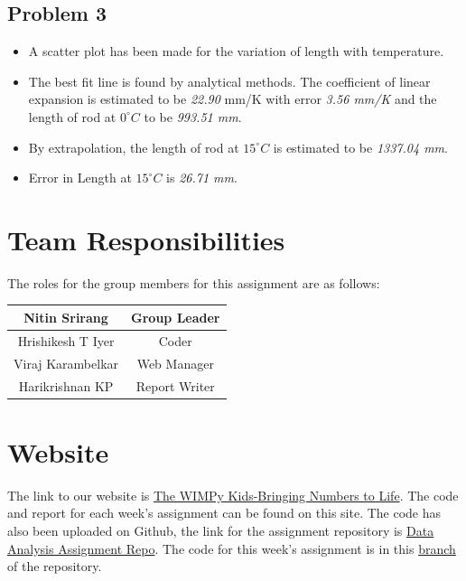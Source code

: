 \documentclass{extarticle}
\begin{document}
		\subsection{\color{MidnightBlue} Problem 3}
		\begin{itemize}
		\item A scatter plot has been made for the variation of length with temperature.
		\item The best fit line is found by analytical methods. The coefficient of linear expansion is estimated to be 
			\emph{22.90} mm/K with error \emph{3.56 mm/K} and the length of rod at $ 0^{\circ}C $ to be \emph{993.51 mm}.
		\item By extrapolation, the length of rod at $ 15^{\circ}C $ is estimated to be \emph{1337.04 mm}.
		\item Error in Length at $ 15^{\circ}C $ is \emph{26.71 mm}.
		\end{itemize}
		
		\newpage
		
	\section{\color{Blue} Team Responsibilities}
		The roles for the group members for this assignment are as follows:
		\begin{center}
		\begin{tabular}{|c|c|}
		\hline
		Nitin Srirang & Group Leader \\
		\hline
		Hrishikesh T Iyer & Coder \\
		\hline
		Viraj Karambelkar & Web Manager \\
		\hline
		Harikrishnan KP & Report Writer \\
		\hline
		\end{tabular}
		\end{center}

	\section{\color{Blue} Website}
		The link to our website is \href{https://thewimpykids.wordpress.com}{The WIMPy Kids-Bringing Numbers to Life}. The 			code and report for each week's assignment can be found on this site. The code has also been uploaded on Github, the link 			for the assignment repository is \href{https://github.com/The-WIMPy-Kids/Data-Analysis-Assignment.git}{Data Analysis 			Assignment Repo}. The code for this week's assignment is in this
		\href{https://github.com/The-WIMPy-Kids/Data-Analysis-Assignment/tree/analytical}{branch} of the repository.
\end{document}
